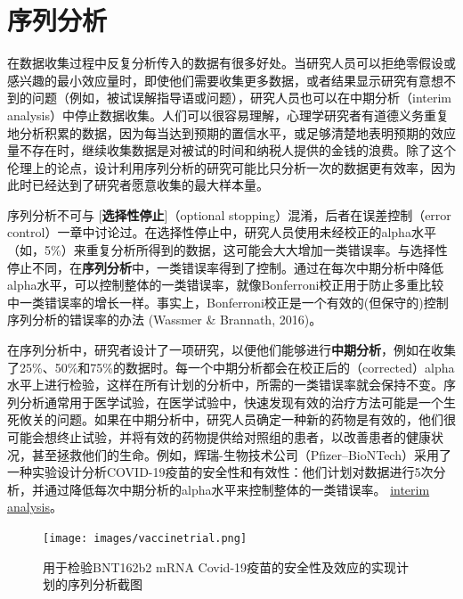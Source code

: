 \documentclass[
  letterpaper,
  DIV=11,
  numbers=noendperiod]{scrreprt}
\begin{document}
\hypertarget{sec-sequential}{%
\chapter{序列分析}\label{sec-sequential}}

在数据收集过程中反复分析传入的数据有很多好处。当研究人员可以拒绝零假设或感兴趣的最小效应量时，即使他们需要收集更多数据，或者结果显示研究有意想不到的问题（例如，被试误解指导语或问题），研究人员也可以在中期分析（interim
analysis）中停止数据收集。人们可以很容易理解，心理学研究者有道德义务重复地分析积累的数据，因为每当达到预期的置信水平，或足够清楚地表明预期的效应量不存在时，继续收集数据是对被试的时间和纳税人提供的金钱的浪费。除了这个伦理上的论点，设计利用序列分析的研究可能比只分析一次的数据更有效率，因为此时已经达到了研究者愿意收集的最大样本量。

序列分析不可与 {[}\textbf{选择性停止}{]}（optional
stopping）混淆，后者在误差控制（error
control）一章中讨论过。在选择性停止中，研究人员使用未经校正的alpha水平（如，5\%）来重复分析所得到的数据，这可能会大大增加一类错误率。与选择性停止不同，在\textbf{序列分析}中，一类错误率得到了控制。通过在每次中期分析中降低alpha水平，可以控制整体的一类错误率，就像Bonferroni校正用于防止多重比较中一类错误率的增长一样。事实上，Bonferroni校正是一个有效的(但保守的)控制序列分析的错误率的办法
(Wassmer \& Brannath, 2016)。

在序列分析中，研究者设计了一项研究，以便他们能够进行\textbf{中期分析}，例如在收集了25\%、50\%和75\%的数据时。每一个中期分析都会在校正后的（corrected）alpha水平上进行检验，这样在所有计划的分析中，所需的一类错误率就会保持不变。序列分析通常用于医学试验，在医学试验中，快速发现有效的治疗方法可能是一个生死攸关的问题。如果在中期分析中，研究人员确定一种新的药物是有效的，他们很可能会想终止试验，并将有效的药物提供给对照组的患者，以改善患者的健康状况，甚至拯救他们的生命。例如，辉瑞-生物技术公司（Pfizer--BioNTech）采用了一种实验设计分析COVID-19疫苗的安全性和有效性：他们计划对数据进行5次分析，并通过降低每次中期分析的alpha水平来控制整体的一类错误率。
\href{https://www.nejm.org/doi/suppl/10.1056/NEJMoa2034577/suppl_file/nejmoa2034577_protocol.pdf}{interim
analysis}。

\begin{figure}

{\centering \texttt{[image: images/vaccinetrial.png]}

}

\caption{用于检验BNT162b2 mRNA
Covid-19疫苗的安全性及效应的实现计划的序列分析截图}

\end{figure}
\end{document}
